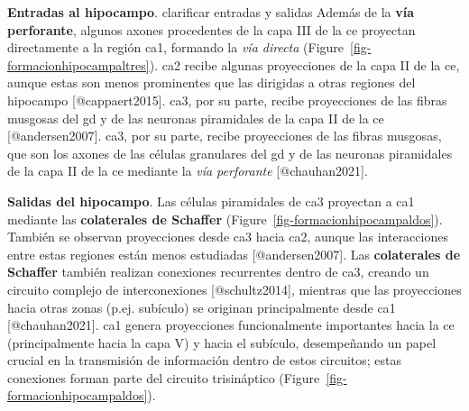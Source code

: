\documentclass[
  11pt]{../MastersDoctoralThesisUNAM}
\begin{document}
\textbf{Entradas al hipocampo}.
\colorbox{BurntOrange}{clarificar entradas y salidas} Además de la
\textbf{vía perforante}, algunos axones procedentes de la
\colorbox{BurntOrange}{capa III} de la \ac{ce} proyectan directamente a
la región \ac{ca}1, formando la \emph{vía directa}
(Figure~\ref{fig-formacionhipocampaltres}). \ac{ca}2 recibe algunas
proyecciones de la \colorbox{BurntOrange}{capa II} de la \ac{ce}, aunque
estas son menos prominentes que las dirigidas a otras regiones del
hipocampo {[}@cappaert2015{]}. \ac{ca}3, por su parte, recibe
proyecciones de las fibras musgosas del \ac{gd} y de las neuronas
piramidales de la capa II de la \ac{ce} {[}@andersen2007{]}. \ac{ca}3,
por su parte, recibe proyecciones de las fibras musgosas, que son los
axones de las células granulares del \ac{gd} y de las neuronas
piramidales de la capa II de la \ac{ce} mediante la \emph{vía
perforante} {[}@chauhan2021{]}.

\textbf{Salidas del hipocampo}. Las células piramidales de \ac{ca}3
proyectan a \ac{ca}1 mediante las \textbf{colaterales de Schaffer}
(Figure~\ref{fig-formacionhipocampaldos}). También se observan
proyecciones desde \ac{ca}3 hacia \ac{ca}2, aunque las interacciones
entre estas regiones están menos estudiadas {[}@andersen2007{]}. Las
\textbf{colaterales de Schaffer} también realizan conexiones recurrentes
dentro de \ac{ca}3, creando un circuito complejo de interconexiones
{[}@schultz2014{]}, mientras que las proyecciones hacia otras zonas
(p.ej. subículo) se originan principalmente desde \ac{ca}1
{[}@chauhan2021{]}. \ac{ca}1 genera proyecciones
\colorbox{BurntOrange}{funcionalmente importantes} hacia la \ac{ce}
(principalmente hacia la \colorbox{BurntOrange}{capa V}) y hacia el
subículo, desempeñando un papel crucial en la transmisión de información
dentro de estos circuitos; estas conexiones forman parte del circuito
trisináptico (Figure~\ref{fig-formacionhipocampaldos}).
\end{document}
